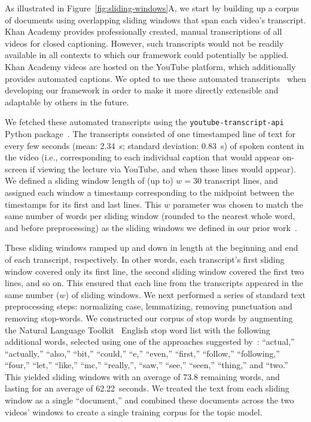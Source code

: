 \documentclass[10pt]{article}
\begin{document}
As illustrated in Figure~\ref{fig:sliding-windows}A, we start by building up a
corpus of documents using overlapping sliding windows that span each video's
transcript. Khan Academy provides professionally created, manual transcriptions
of all videos for closed captioning. However, such transcripts would not be
readily available in all contexts to which our framework could potentially be
applied. Khan Academy videos are hosted on the YouTube platform, which
additionally provides automated captions. We opted to use these automated
transcripts~\citep[which, in prior work, we have found to be of sufficiently
near-human quality to yield reliable data in behavioral
studies; ][]{ZimaEtal18} when developing our framework in order to make
it more directly extensible and adaptable by others in the future.

We fetched these automated transcripts using the
\texttt{youtube-transcript-api} Python package~\citep{Depo18}. The transcripts
consisted of one timestamped line of text for every few seconds (mean: 2.34~s;
standard deviation: 0.83~s) of spoken content in the video (i.e., corresponding
to each individual caption that would appear on-screen if viewing the lecture
via YouTube, and when those lines would appear). We defined a sliding window
length of (up to) $w = 30$ transcript lines, and assigned each window a
timestamp corresponding to the midpoint between the timestamps for its first
and last lines. This $w$ parameter was chosen to match the same number of words
per sliding window (rounded to the nearest whole word, and before
preprocessing) as the sliding windows we defined in our prior
work~\citep[][i.e., 185 words per sliding window]{HeusEtal21}.

These sliding windows ramped up and down in length at the beginning and end of
each transcript, respectively. In other words, each transcript's first sliding
window covered only its first line, the second sliding window covered the first
two lines, and so on. This ensured that each line from the transcripts appeared
in the same number ($w$) of sliding windows. We next performed a series of
standard text preprocessing steps: normalizing case, lemmatizing, removing
punctuation and removing stop-words. We constructed our corpus of stop words by
augmenting the Natural Language Toolkit~\citep[NLTK; ][]{BirdEtal09} English
stop word list with the following additional words, selected using one of the
approaches suggested by~\citet{BoydEtal14}: ``actual,'' ``actually,'' ``also,''
``bit,'' ``could,'' ``e,'' ``even,'' ``first,'' ``follow,'' ``following,''
``four,'' ``let,'' ``like,'' ``mc,'' ``really,'', ``saw,'' ``see,'' ``seen,''
``thing,'' and ``two.'' This yielded sliding windows with an average of 73.8
remaining words, and lasting for an average of 62.22~seconds. We treated the
text from each sliding window as a single ``document,'' and combined these
documents across the two videos' windows to create a single training corpus for
the topic model.
\end{document}

